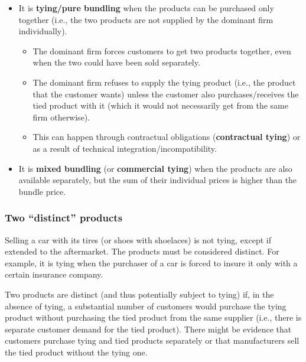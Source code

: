             \begin{itemize}
                \item It is \textbf{tying/pure bundling} when the products can be purchased only together (i.e., the two products are not supplied by the dominant firm individually).
                \begin{itemize}
                    \item The dominant firm forces customers to get two products together, even when the two could have been sold separately.
                    \item The dominant firm refuses to supply the tying product (i.e., the product that the customer wants) unless the customer also purchases/receives the tied product with it (which it would not necessarily get from the same firm otherwise).
                    \item This can happen through contractual obligations (\textbf{contractual tying}) or as a result of technical integration/incompatibility.
                \end{itemize}
                \item It is \textbf{mixed bundling} (or \textbf{commercial tying}) when the products are also available separately, but the sum of their individual prices is higher than the bundle price.
            \end{itemize}

        \subsubsection{Two “distinct” products}

            Selling a car with its tires (or shoes with shoelaces) is not tying, except if extended to the aftermarket. The products must be considered distinct. For example, it is tying when the purchaser of a car is forced to insure it only with a certain insurance company.

            Two products are distinct (and thus potentially subject to tying) if, in the absence of tying, a substantial number of customers would purchase the tying product without purchasing the tied product from the same supplier (i.e., there is separate customer demand for the tied product). There might be evidence that customers purchase tying and tied products separately or that manufacturers sell the tied product without the tying one.
            
